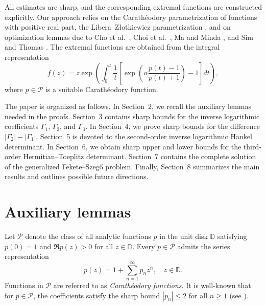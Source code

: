 \documentclass[11pt,reqno]{amsart}
\numberwithin{equation}{section}
\begin{document}
All estimates are sharp, and the corresponding extremal functions are constructed explicitly. Our approach relies on the Carath\'eodory parametrization of functions with positive real part, the Libera--Z{\l}otkiewicz parametrization \cite{LZ}, and on optimization lemmas due to Cho et al.\ \cite{C12}, Choi et al.\ \cite{CKS1}, Ma and Minda \cite{MM}, and Sim and Thomas \cite{SimThomas2020}. The extremal functions are obtained from the integral representation
\[
f(z)
=
z\exp\left(
\int_0^z \frac{1}{t}
\left[
\exp\left(
\alpha\frac{p(t)-1}{p(t)+1}
\right)
-1
\right]
dt
\right),
\]
where $p\in\mathcal{P}$ is a suitable Carath\'eodory function.

The paper is organized as follows. In Section~2, we recall the auxiliary lemmas needed in the proofs. Section~3 contains sharp bounds for the inverse logarithmic coefficients $\Gamma_1$, $\Gamma_2$, and $\Gamma_3$. In Section~4, we prove sharp bounds for the difference $|\Gamma_2|-|\Gamma_1|$. Section~5 is devoted to the second-order inverse logarithmic Hankel determinant. In Section~6, we obtain sharp upper and lower bounds for the third-order Hermitian--Toeplitz determinant. Section~7 contains the complete solution of the generalized Fekete--Szeg\H{o} problem. Finally, Section~8 summarizes the main results and outlines possible future directions.
\section{Auxiliary lemmas}

Let $\mathcal{P}$ denote the class of all analytic functions $p$ in the unit disk $\mathbb{D}$ satisfying $p(0) = 1$ and $\Re p(z) > 0$ for all $z \in \mathbb{D}$. Every $p \in \mathcal{P}$ admits the series representation
\begin{equation}\label{p1}
p(z) = 1 + \sum_{n=1}^{\infty} p_n z^n, \quad z \in \mathbb{D}.
\end{equation}
Functions in $\mathcal{P}$ are referred to as \emph{Carath\'{e}odory functions}. It is well-known that for $p \in \mathcal{P}$, the coefficients satisfy the sharp bound $|p_n| \le 2$ for all $n \ge 1$ (see \cite{PLD1}).
\end{document}
